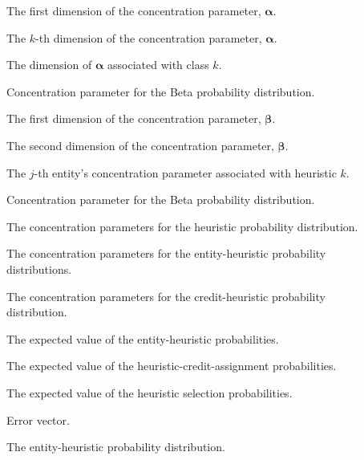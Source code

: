 \begin{description}

	\item [\parbox{2cm}{$\alpha_{1}$}] \parbox{12.5cm}{The first dimension of the concentration parameter, $\boldsymbol{\alpha}$.}
	\item [\parbox{2cm}{$\alpha_{K}$}] \parbox{12.5cm}{The $k$-th dimension of the concentration parameter, $\boldsymbol{\alpha}$.}
	\item [\parbox{2cm}{$\alpha_{k}$}] \parbox{12.5cm}{The dimension of $\boldsymbol{\alpha}$ associated with class $k$.}
	\item [\parbox{2cm}{$\alpha$}] \parbox{12.5cm}{Concentration parameter for the Beta probability distribution.}
	\item [\parbox{2cm}{$\beta_{1}$}] \parbox{12.5cm}{The first dimension of the concentration parameter, $\boldsymbol{\beta}$.}
	\item [\parbox{2cm}{$\beta_{2}$}] \parbox{12.5cm}{The second dimension of the concentration parameter, $\boldsymbol{\beta}$.}
	\item [\parbox{2cm}{$\beta_{j,k}$}] \parbox{12.5cm}{The $j$-th entity's concentration parameter associated with heuristic $k$.}
	\item [\parbox{2cm}{$\beta$}] \parbox{12.5cm}{Concentration parameter for the Beta probability distribution.}
	\item [\parbox{2cm}{$\boldsymbol{\alpha}$}] \parbox{12.5cm}{The concentration parameters for the heuristic probability distribution.}
	\item [\parbox{2cm}{$\boldsymbol{\beta}$}] \parbox{12.5cm}{The concentration parameters for the entity-heuristic probability distributions.}
	\item [\parbox{2cm}{$\boldsymbol{\gamma}$}] \parbox{12.5cm}{The concentration parameters for the credit-heuristic probability distribution.}
	\item [\parbox{2cm}{$\boldsymbol{\hat{\phi}}$}] \parbox{12.5cm}{The expected value of the entity-heuristic probabilities.}
	\item [\parbox{2cm}{$\boldsymbol{\hat{\psi}}$}] \parbox{12.5cm}{The expected value of the heuristic-credit-assignment probabilities.}
	\item [\parbox{2cm}{$\boldsymbol{\hat{\theta}}$}] \parbox{12.5cm}{The expected value of the heuristic selection probabilities.}
	\item [\parbox{2cm}{$\boldsymbol{\lambda}$}] \parbox{12.5cm}{Error vector.}
	\item [\parbox{2cm}{$\boldsymbol{\phi}$}] \parbox{12.5cm}{The entity-heuristic probability distribution.}

\end{description}
